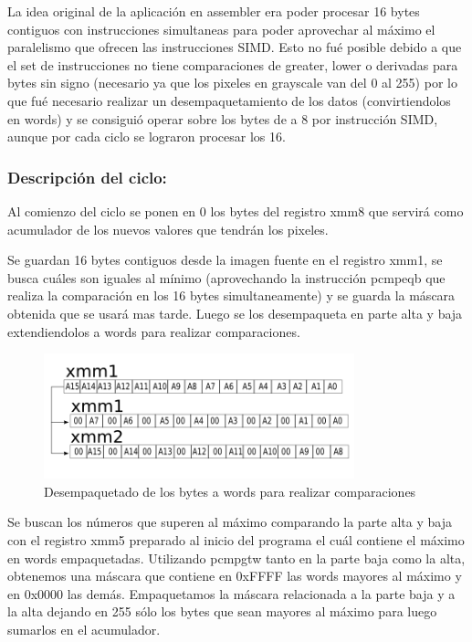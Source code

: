 La idea original de la aplicación en assembler era poder procesar 16 bytes contiguos con instrucciones simultaneas para poder aprovechar al máximo el paralelismo que ofrecen las instrucciones SIMD. Esto no fué posible debido a que el set de instrucciones no tiene comparaciones de greater, lower o derivadas para bytes sin signo (necesario ya que los pixeles en grayscale van del 0 al 255) por lo que fué necesario realizar un desempaquetamiento de los datos (convirtiendolos en words) y se consiguió operar sobre los bytes de a 8 por instrucción SIMD, aunque por cada ciclo se lograron procesar los 16.

\subsubsection{Descripción del ciclo:}
Al comienzo del ciclo se ponen en 0 los bytes del registro xmm8 que servirá como acumulador de los nuevos valores que tendrán los pixeles.

Se guardan 16 bytes contiguos desde la imagen fuente en el registro xmm1, se busca cuáles son iguales al mínimo (aprovechando la instrucción pcmpeqb que realiza la comparación en los 16 bytes simultaneamente) y se guarda la máscara obtenida que se usará mas tarde. Luego se los desempaqueta en parte alta y baja extendiendolos a words para realizar comparaciones.

\begin{figure}[ht!]
\centering
\includegraphics[width=90mm]{unpackxmm1.png}
\caption{Desempaquetado de los bytes a words para realizar comparaciones}
\label{overflow}
\end{figure}

Se buscan los números que superen al máximo comparando la parte alta y baja con el registro xmm5 preparado al inicio del programa el cuál contiene el máximo en words empaquetadas. Utilizando pcmpgtw tanto en la parte baja como la alta, obtenemos una máscara que contiene en 0xFFFF las words mayores al máximo y en 0x0000 las demás. Empaquetamos la máscara relacionada a la parte baja y a la alta dejando en 255 sólo los bytes que sean mayores al máximo para luego sumarlos en el acumulador.


